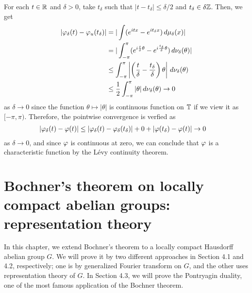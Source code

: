 \documentclass[a4paper]{article}
\begin{document}
\begin{pf}
For each $t\in\mathbb{R}$ and $\delta>0$, take $t_\delta$ such that $|t-t_\delta|\le\delta/2$ and $t_\delta\in\delta\mathbb{Z}$.
Then, we get
\begin{align*}
|\varphi_\delta(t)-\varphi_u(t_\delta)|
&=|\int(e^{itx}-e^{it_\delta x})\,d\mu_\delta(x)|\\
&=|\int_{-\pi}^\pi(e^{i\frac t\delta\theta}-e^{i\frac{t_\delta}\delta\theta})\,d\nu_\delta(\theta)|\\
&\le\int_{-\pi}^\pi\left|\left(\frac t\delta-\frac{t_\delta}\delta\right)\theta\right|\,d\nu_\delta(\theta)\\
&\le\frac12\int_{-\pi}^\pi|\theta|\,d\nu_\delta(\theta)\to0
\end{align*}
as $\delta\to0$ since the function $\theta\mapsto|\theta|$ is continuous function on $\mathbb{T}$ if we view it as $[-\pi,\pi)$.
Therefore, the pointwise convergence is verfied as
\begin{align*}
|\varphi_\delta(t)-\varphi(t)|&\le|\varphi_\delta(t)-\varphi_\delta(t_\delta)|+0+|\varphi(t_\delta)-\varphi(t)|\to0
\end{align*}
as $\delta\to0$, and since $\varphi$ is continuous at zero, we can conclude that $\varphi$ is a characteristic function by the L\'evy continuity theorem.
\end{pf}



\iffalse
\subsection{Notes on non-locally compact groups}
bochner
measure <=> pos def continuous

schwarts bochner (finite condition removed)
tempered measure <=> pos def tempered dist


on hilbert space
measure <=> pos def continuous + trace class
\fi









\newpage
\section{Bochner's theorem on locally compact abelian groups: representation theory}

In this chapter, we extend Bochner's theorem to a locally compact Hausdorff abelian group $G$.
We will prove it by two different approaches in Section 4.1 and 4.2, respectively; one is by generalized Fourier transform on $G$, and the other uses representation theory of $G$.
In Section 4.3, we will prove the Pontryagin duality, one of the most famous application of the Bochner theorem.
\end{document}
